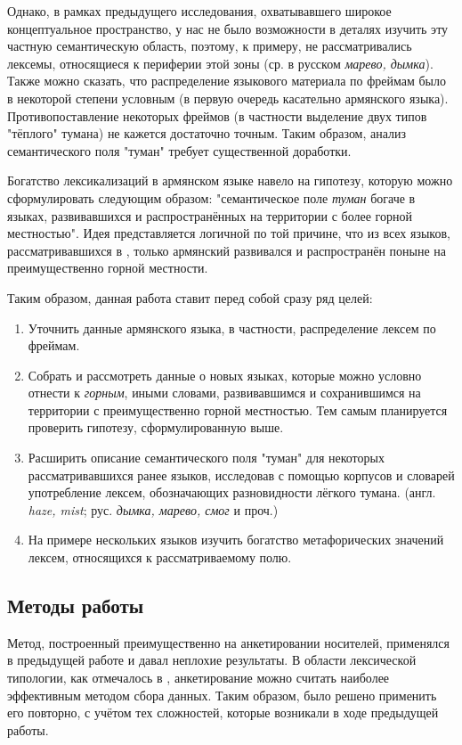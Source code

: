 \par Однако, в рамках предыдущего исследования, охватывавшего широкое концептуальное пространство, у нас не было возможности в деталях изучить эту частную семантическую область, поэтому, к примеру, не рассматривались лексемы, относящиеся к периферии этой зоны (ср. в русском \textit{марево, дымка}). Также можно сказать, что распределение языкового материала по фреймам было в некоторой степени условным (в первую очередь касательно армянского языка). Противопоставление некоторых фреймов (в частности выделение двух типов "тёплого" тумана) не кажется достаточно точным. Таким образом, анализ семантического поля "туман" требует существенной доработки. 

\par Богатство лексикализаций в армянском языке навело на гипотезу, которую можно сформулировать следующим образом: "семантическое поле \textit{туман} богаче в языках, развивавшихся и распространённых на территории с более горной местностью". Идея представляется логичной по той причине, что из всех языков, рассматривавшихся в \citep{соколовский2017}, только армянский развивался и распространён поныне на преимущественно горной местности. 

\par Таким образом, данная работа ставит перед собой сразу ряд целей:
\begin{enumerate}
\item Уточнить данные армянского языка, в частности, распределение лексем по фреймам.
\item Собрать и рассмотреть данные о новых языках, которые можно условно отнести к \textit{горным}, иными словами, развивавшимся и сохранившимся на территории с преимущественно горной местностью. Тем самым планируется проверить гипотезу, сформулированную выше.
\item Расширить описание семантического поля "туман" для некоторых рассматривавшихся ранее языков, исследовав с помощью корпусов и словарей употребление лексем, обозначающих разновидности лёгкого тумана. (англ. \textit{haze, mist}; рус. \textit{дымка, марево, смог} и проч.) 
\item На примере нескольких языков изучить богатство метафорических значений лексем, относящихся к рассматриваемому полю.
\end{enumerate}

\subsection{Методы работы} \label{methods}
\par Метод, построенный преимущественно на анкетировании носителей, применялся в предыдущей работе и давал неплохие результаты. В области лексической типологии, как отмечалось в \citep{рыжова2015построение}, анкетирование можно считать наиболее эффективным методом сбора данных. Таким образом, было решено применить его повторно, с учётом тех сложностей, которые возникали в ходе предыдущей работы.

